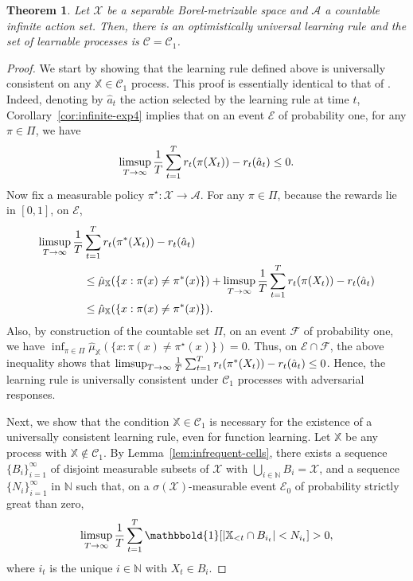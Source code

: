 \documentclass[aos]{imsart}
\theoremstyle{plain}
\newtheorem{theorem}{Theorem}[section]
\theoremstyle{remark}
\newcommand{\Acal}{\mathcal{A}}
\newcommand{\Ccal}{\mathcal{C}}
\newcommand{\Ecal}{\mathcal{E}}
\newcommand{\Fcal}{\mathcal{F}}
\newcommand{\Xcal}{\mathcal{X}}
\newcommand{\Xbb}{\mathbb{X}}
\newcommand{\1}{\mathbbm{1}}%
\newcommand{\Event}{\mathscr{E}}
\newcommand{\X}{\mathcal X}
\newcommand{\nats}{\mathbb{N}}
\renewcommand{\limsup}{\mathop{\rm limsup}}
\newcommand{\ind}{\mathbbold{1}}
\newcommand{\ProcX}{\mathbb{X}}
\newcommand{\goodpol}{\pi^{\star}}
\newcommand{\KC}{\mathcal{C}_{1}}
\begin{document}
\begin{theorem}
\label{thm:KC-infinite-actions}
Let $\Xcal$ be a separable Borel-metrizable space and $\Acal$ a countable infinite action set. Then, there is an optimistically universal learning rule and the set of learnable processes is $\Ccal =\Ccal_1$.
\end{theorem}
\begin{proof}
We start by showing that the learning rule defined above is universally consistent on any $\Xbb\in\Ccal_1$ process. This proof is essentially identical to that of \citep*[][Theorem 1]{hanneke:22a}. Indeed, denoting by  $\hat a_t$ the action selected by the learning rule at time $t$, Corollary~\ref{cor:infinite-exp4} implies that on an event $\Ecal$ of probability one, for any $\pi\in\Pi$, we have
\begin{equation*}
    \limsup_{T\to\infty}\frac{1}{T}\sum_{t=1}^T r_t(\pi(X_t))-r_t(\hat a_t) \leq 0.
\end{equation*}
Now fix a measurable policy $\pi^\star:\Xcal\to\Acal$. For any $\pi\in\Pi$, because the rewards lie in $[0,1]$, on $\Ecal$,
\begin{align*}
    \limsup_{T\to\infty}\frac{1}{T}&\sum_{t=1}^T r_t(\pi^*(X_t))-r_t(\hat a_t)\\ &\leq \hat \mu_\Xbb(\{x:\pi(x)\neq\pi^*(x)\}) +  \limsup_{T\to\infty}\frac{1}{T}\sum_{t=1}^T r_t(\pi(X_t))-r_t(\hat a_t)\\
    &\leq \hat \mu_\Xbb(\{x:\pi(x)\neq\pi^*(x)\}).
\end{align*}
Also, by construction of the countable set $\Pi$, on an event $\Fcal$ of probability one, we have $\inf_{\pi \in \Pi} \hat{\mu}_{\ProcX}( \{ x : \pi(x) \neq \goodpol(x) \} )=0$. Thus, on $\Ecal\cap\Fcal$, the above inequality shows that $\limsup_{T\to\infty}\frac{1}{T}\sum_{t=1}^T r_t(\pi^*(X_t))-r_t(\hat a_t) \leq 0$. Hence, the learning rule is universally consistent under $\Ccal_1$ processes with adversarial responses.

Next, we show that the condition $\Xbb\in\Ccal_1$ is necessary for the 
existence of a universally consistent learning rule, even for function learning.
Let $\ProcX$ be any process with $\ProcX \notin \KC$.
By Lemma~\ref{lem:infrequent-cells}, there exists a sequence $\{B_i\}_{i=1}^{\infty}$ 
of disjoint measurable subsets of $\X$ 
with $\bigcup\limits_{i \in \nats} B_i = \X$, 
and a sequence $\{N_i\}_{i=1}^{\infty}$ in $\nats$
such that, 
on a $\sigma(\X)$-measurable event $\Event_0$ 
of probability strictly great than zero,
\begin{equation*}
\limsup_{T \to \infty} \frac{1}{T} \sum_{t=1}^{T} \ind\!\left[ \left| \Xbb_{< t} \cap B_{i_t} \right| < N_{i_t} \right] > 0,
\end{equation*}
where $i_t$ is the unique $i \in \nats$ 
with $X_t \in B_i$.


\end{proof}
\end{document}
